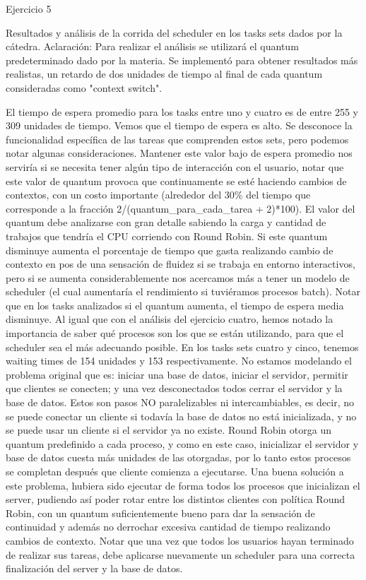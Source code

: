 
\begin{section}{Ejercicio 5}

	Resultados y análisis de la corrida del scheduler  en los tasks sets dados por la cátedra.
	Aclaración: Para realizar el análisis se utilizará el quantum predeterminado dado por la materia.
	Se implementó para obtener resultados más realistas, un retardo de dos unidades de tiempo al final de cada quantum consideradas como "context switch".

	El tiempo de espera promedio para los tasks entre uno y cuatro es de entre 255 y 309 unidades de tiempo.
	Vemos que el tiempo de espera es alto. Se desconoce la funcionalidad específica de las tareas que comprenden estos sets, pero podemos notar algunas consideraciones. Mantener este valor bajo de espera promedio nos serviría si se necesita tener algún tipo de interacción con el usuario, notar que este valor de quantum provoca que continuamente se esté haciendo cambios de contextos, con un costo importante (alrededor del 30\% del tiempo que corresponde a la fracción 2/(quantum_para_cada_tarea + 2)*100).
	El valor del quantum debe analizarse con gran detalle sabiendo la carga y cantidad de trabajos que tendría el CPU corriendo con Round Robin. Si este quantum disminuye aumenta el porcentaje de tiempo que gasta realizando cambio de contexto en pos de una sensación de fluidez si se trabaja en entorno interactivos, pero si se aumenta considerablemente nos acercamos más a tener un modelo de scheduler  (el cual aumentaría el rendimiento si tuviéramos procesos batch). Notar que en los tasks analizados si el quantum aumenta, el tiempo de espera media disminuye.
	Al igual que con el análisis del ejercicio cuatro, hemos notado la importancia de saber qué procesos son los que se están utilizando, para que el scheduler sea el más adecuando posible. En los tasks sets cuatro y cinco, tenemos waiting times de 154 unidades y 153 respectivamente. No estamos modelando el problema original que es: iniciar una base de datos, iniciar el servidor, permitir que clientes se conecten; y una vez desconectados todos cerrar el servidor y la base de datos. Estos son pasos NO paralelizables ni intercambiables, es decir, no se puede conectar un cliente si todavía la base de datos no está inicializada, y no se puede usar un cliente si el servidor ya no existe. Round Robin otorga un quantum predefinido a cada proceso, y como en este caso, inicializar el servidor y base de datos cuesta más unidades de las otorgadas, por lo tanto estos procesos se completan después que cliente comienza a ejecutarse. Una buena solución a este problema, hubiera sido ejecutar de forma  todos los procesos que inicializan el server, pudiendo así poder rotar entre los distintos clientes con política Round Robin, con un quantum suficientemente bueno para dar la sensación de continuidad y además no derrochar excesiva cantidad de tiempo realizando cambios de contexto. Notar que una vez que todos los usuarios hayan terminado de realizar sus tareas, debe aplicarse nuevamente un scheduler  para una correcta finalización del server y la base de datos.

\end{section}

